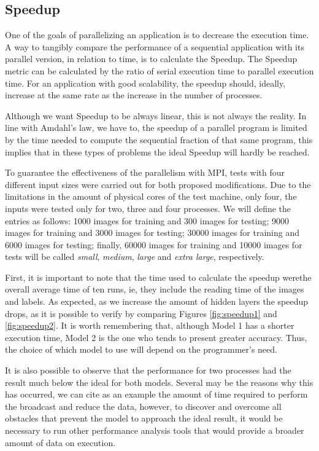 \documentclass[conference]{IEEEtran}
\begin{document}
\subsection{Speedup}
One of the goals of parallelizing an application is to decrease the execution time. A way to tangibly compare the performance of a sequential application with its parallel version, in relation to time, is to calculate the Speedup. The Speedup metric can be calculated by the ratio of serial execution time to parallel execution time. For an application with good scalability, the speedup should, ideally, increase at the same rate as the increase in the number of processes.

Although we want Speedup to be always linear, this is not always the reality. In line with Amdahl's law\cite{schmidt2017parallel}, we have to, the speedup of a parallel program is limited by the time needed to compute the sequential fraction of that same program, this implies that in these types of problems the ideal Speedup will hardly be reached.

To guarantee the effectiveness of the parallelism with MPI, tests with four different input sizes were carried out for both proposed modifications. Due to the limitations in the amount of physical cores of the test machine, only four, the inputs were tested only for two, three and four processes. We will define the entries as follows: 1000 images for training and 300 images for testing; 9000 images for training and 3000 images for testing; 30000 images for training and 6000 images for testing; finally, 60000 images for training and 10000 images for tests will be called \textit{small}, \textit{medium}, \textit{large} and \textit{extra large}, respectively.

First, it is important to note that the time used to calculate the speedup werethe overall average time of ten runs, ie, they include the reading time of the images and labels. As expected, as we increase the amount of hidden layers the speedup drops, as it is possible to verify by comparing Figures \ref{fig:speedup1} and \ref{fig:speedup2}. It is worth remembering that, although Model 1 has a shorter execution time, Model 2 is the one who tends to present greater accuracy. Thus, the choice of which model to use will depend on the programmer's need.

It is also possible to observe that the performance for two processes had the result much below the ideal for both models. Several may be the reasons why this has occurred, we can cite as an example the amount of time required to perform the broadcast and reduce the data, however, to discover and overcome all obstacles that prevent the model to approach the ideal result, it would be necessary to run other performance analysis tools that would provide a broader amount of data on execution.
\end{document}

